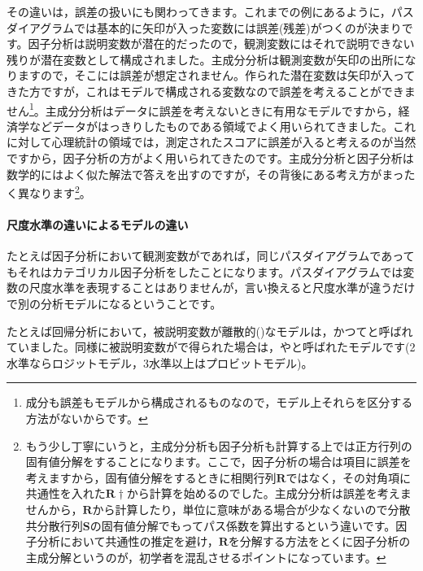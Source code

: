 \documentclass{ltjsbook}
\begin{document}
その違いは，誤差の扱いにも関わってきます。これまでの例にあるように，パスダイアグラムでは基本的に矢印が入った変数には誤差(残差)がつくのが決まりです。因子分析は説明変数が潜在的だったので，観測変数にはそれで説明できない残りが潜在変数として構成されました。主成分分析は観測変数が矢印の出所になりますので，そこには誤差が想定されません。作られた潜在変数は矢印が入ってきた方ですが，これはモデルで構成される変数なので誤差を考えることができません\footnote{成分も誤差もモデルから構成されるものなので，モデル上それらを区分する方法がないからです。}。主成分分析はデータに誤差を考えないときに有用なモデルですから，経済学などデータがはっきりしたものである領域でよく用いられてきました。これに対して心理統計の領域では，測定されたスコアに誤差が入ると考えるのが当然ですから，因子分析の方がよく用いられてきたのです。主成分分析と因子分析は数学的にはよく似た解法で答えを出すのですが，その背後にある考え方がまったく異なります\footnote{もう少し丁寧にいうと，主成分分析も因子分析も計算する上では正方行列の固有値分解をすることになります。ここで，因子分析の場合は項目に誤差を考えますから，固有値分解をするときに相関行列$\bm{R}$ではなく，その対角項に共通性を入れた$\bm{R}\dagger$から計算を始めるのでした。主成分分析は誤差を考えませんから，$\bm{R}$から計算したり，単位に意味がある場合が少なくないので分散共分散行列$\bm{S}$の固有値分解でもってパス係数を算出するという違いです。因子分析において共通性の推定を避け，$\bm{R}$を分解する方法をとくに因子分析の主成分解というのが，初学者を混乱させるポイントになっています。}。

\paragraph{尺度水準の違いによるモデルの違い}

たとえば因子分析において観測変数がであれば，同じパスダイアグラムであってもそれはカテゴリカル因子分析をしたことになります。パスダイアグラムでは変数の尺度水準を表現することはありませんが，言い換えると尺度水準が違うだけで別の分析モデルになるということです。

たとえば回帰分析において，被説明変数が離散的()なモデルは，かつてと呼ばれていました。同様に被説明変数がで得られた場合は，やと呼ばれたモデルです(2水準ならロジットモデル，3水準以上はプロビットモデル)。
\end{document}
